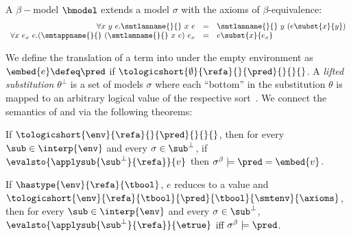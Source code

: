 %
\begin{definition}\label{def:beta-model}
A $\beta-$model $\bmodel$ extends a model $\sigma$
with the axioms of $\beta$-equivalence:
$$
\begin{array}{rcl}
\forall x\ y\ e. \smtlamname{}{}\ x\ e
  & = & \smtlamname{}{}\ y\ (e\subst{x}{y}) \\
\forall x\ e_x\ e. (\smtappname{}{}\ (\smtlamname{}{}\ x\ e)\ e_x
  & = &  e\subst{x}{e_x}
\end{array}
$$
\end{definition}

%
We define the translation of a \corelan term
into \smtlan under the empty environment as
${\embed{e} \defeq \pred}$
if ${\tologicshort{\emptyset}{\refa}{}{\pred}{}{}{}}$.
%
A \emph{lifted substitution}
$\theta^\perp$ is a set of models $\sigma$
where each ``bottom'' in the substitution
$\theta$ is mapped to an arbitrary logical
value of the respective sort~\citep{Vazou14}.
%
We connect the semantics of \corelan and
\smtlan via the following theorems:

\begin{theorem}\label{thm:embedding-general}
If ${\tologicshort{\env}{\refa}{}{\pred}{}{}{}}$,
then for every ${\sub\in\interp{\env}}$
and every ${\sigma\in {\sub^\perp}}$,
if $\evalsto{\applysub{\sub^\perp}{\refa}}{v}$
then $\sigma^\beta \models \pred = \embed{v}$.
\end{theorem}


\begin{corollary}\label{thm:embedding}
If ${\hastype{\env}{\refa}{\tbool}}$, $e$ reduces to a value and
${\tologicshort{\env}{\refa}{\tbool}{\pred}{\tbool}{\smtenv}{\axioms}}$,
then for every ${\sub\in\interp{\env}}$
and every ${\sigma\in {\sub^\perp}}$,
$\evalsto{\applysub{\sub^\perp}{\refa}}{\etrue}$ iff
$\sigma^\beta \models \pred$.
\end{corollary}



